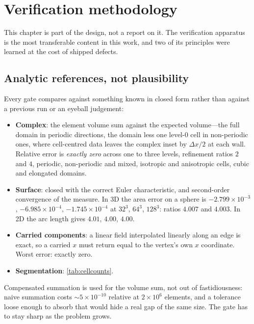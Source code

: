 \chapter{Verification methodology}
\label{ch:verification}

This chapter is part of the design, not a report on it. The verification
apparatus is the most transferable content in this work, and two of its
principles were learned at the cost of shipped defects.

\section{Analytic references, not plausibility}

Every gate compares against something known in closed form rather than against
a previous run or an eyeball judgement:

\begin{itemize}[leftmargin=*]
\item \textbf{Complex}: the element volume sum against the expected volume---the
  full domain in periodic directions, the domain less one level-0 cell in
  non-periodic ones, where cell-centred data leaves the complex inset by
  $\Delta x/2$ at each wall. Relative error is \emph{exactly zero} across one to
  three levels, refinement ratios $2$ and $4$, periodic, non-periodic and mixed,
  isotropic and anisotropic cells, cubic and elongated domains.
\item \textbf{Surface}: closed with the correct Euler characteristic, and
  second-order convergence of the measure. In 3D the area error on a sphere is
  $-2.799\times10^{-3}$, $-6.985\times10^{-4}$, $-1.745\times10^{-4}$ at
  $32^3$, $64^3$, $128^3$: ratios $4.007$ and $4.003$. In 2D the arc length
  gives $4.01$, $4.00$, $4.00$.
\item \textbf{Carried components}: a linear field interpolated linearly along an
  edge is exact, so a carried $x$ must return equal to the vertex's own $x$
  coordinate. Worst error: exactly zero.
\item \textbf{Segmentation}: \cref{tab:cellcounts}.
\end{itemize}

Compensated summation is used for the volume sum, not out of fastidiousness:
naive summation costs $\sim 5\times10^{-10}$ relative at $2\times 10^6$
elements, and a tolerance loose enough to absorb that would hide a real gap of
the same size. The gate has to stay sharp as the problem grows.

